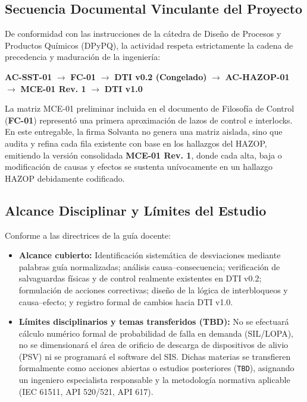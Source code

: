 \documentclass[10pt,letterpaper]{article}
\begin{document}
\subsection{Secuencia Documental Vinculante del Proyecto}
De conformidad con las instrucciones de la cátedra de Diseño de Procesos y Productos Químicos (DPyPQ), la actividad respeta estrictamente la cadena de precedencia y maduración de la ingeniería:
\begin{center}
\textbf{AC-SST-01} $\longrightarrow$ \textbf{FC-01} $\longrightarrow$ \textbf{DTI v0.2 (Congelado)} $\longrightarrow$ \textbf{AC-HAZOP-01} $\longrightarrow$ \textbf{MCE-01 Rev. 1} $\longrightarrow$ \textbf{DTI v1.0}
\end{center}
La matriz MCE-01 preliminar incluida en el documento de Filosofía de Control (\textbf{FC-01}) representó una primera aproximación de lazos de control e interlocks. En este entregable, la firma Solvanta no genera una matriz aislada, sino que audita y refina cada fila existente con base en los hallazgos del HAZOP, emitiendo la versión consolidada \textbf{MCE-01 Rev. 1}, donde cada alta, baja o modificación de causas y efectos se sustenta unívocamente en un hallazgo HAZOP debidamente codificado.

\subsection{Alcance Disciplinar y Límites del Estudio}
Conforme a las directrices de la guía docente:
\begin{itemize}
    \item \textbf{Alcance cubierto:} Identificación sistemática de desviaciones mediante palabras guía normalizadas; análisis causa--consecuencia; verificación de salvaguardas físicas y de control realmente existentes en DTI v0.2; formulación de acciones correctivas; diseño de la lógica de interbloqueos y causa--efecto; y registro formal de cambios hacia DTI v1.0.
    \item \textbf{Límites disciplinarios y temas transferidos (TBD):} No se efectuará cálculo numérico formal de probabilidad de falla en demanda (SIL/LOPA), no se dimensionará el área de orificio de descarga de dispositivos de alivio (PSV) ni se programará el software del SIS. Dichas materias se transfieren formalmente como acciones abiertas o estudios posteriores (\texttt{TBD}), asignando un ingeniero especialista responsable y la metodología normativa aplicable (IEC 61511, API 520/521, API 617).
\end{itemize}
\newpage
\end{document}
